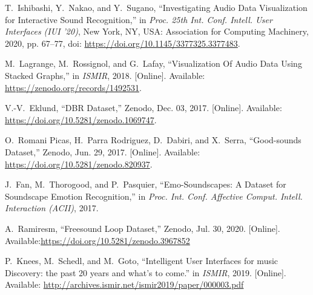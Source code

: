 \documentclass{article}
\begin{document}
\begin{thebibliography}{citations}
T.~Ishibashi, Y.~Nakao, and Y.~Sugano, ``Investigating Audio Data Visualization for Interactive Sound Recognition,'' in \emph{Proc. 25th Int. Conf. Intell. User Interfaces (IUI '20)}, New York, NY, USA: Association for Computing Machinery, 2020, pp. 67–77, doi: \url{https://doi.org/10.1145/3377325.3377483}.

M.~Lagrange, M.~Rossignol, and G.~Lafay, ``Visualization Of Audio Data Using Stacked Graphs,'' in \emph{ISMIR}, 2018. [Online]. Available: \url{https://zenodo.org/records/1492531}.

V.-V.~Eklund, ``DBR Dataset,'' Zenodo, Dec. 03, 2017. [Online]. Available: \url{https://doi.org/10.5281/zenodo.1069747}.

O.~Romani Picas, H.~Parra Rodriguez, D.~Dabiri, and X.~Serra, ``Good-sounds Dataset,'' Zenodo, Jun. 29, 2017. [Online]. Available: \url{https://doi.org/10.5281/zenodo.820937}.

J.~Fan, M.~Thorogood, and P.~Pasquier, ``Emo-Soundscapes: A Dataset for Soundscape Emotion Recognition,'' in \emph{Proc. Int. Conf. Affective Comput. Intell. Interaction (ACII)}, 2017.

A.~Ramiresm, ``Freesound Loop Dataset,'' Zenodo, Jul. 30, 2020. [Online]. Available:\url{https://doi.org/10.5281/zenodo.3967852}

P.~Knees, M.~Schedl, and M.~Goto, ``Intelligent User Interfaces for music Discovery: the past 20 years and what’s to come.'' in \emph{ISMIR}, 2019. [Online]. Available: \url{http://archives.ismir.net/ismir2019/paper/000003.pdf}




\end{thebibliography}
\end{document}
